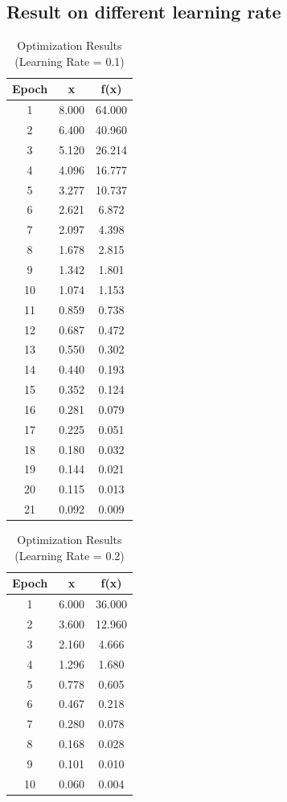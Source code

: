 \documentclass{article}
\begin{document}
\subsection{Result on different learning rate}
\begin{table}[h!]
\centering
\caption{Optimization Results (Learning Rate = 0.1)}
\label{tab:optimization_results}
\begin{tabular}{|c|c|c|}
\hline
\textbf{Epoch} & \textbf{x} & \textbf{f(x)} \\ \hline
1  & 8.000 & 64.000 \\ \hline
2  & 6.400 & 40.960 \\ \hline
3  & 5.120 & 26.214 \\ \hline
4  & 4.096 & 16.777 \\ \hline
5  & 3.277 & 10.737 \\ \hline
6  & 2.621 & 6.872  \\ \hline
7  & 2.097 & 4.398  \\ \hline
8  & 1.678 & 2.815  \\ \hline
9  & 1.342 & 1.801  \\ \hline
10 & 1.074 & 1.153  \\ \hline
11 & 0.859 & 0.738  \\ \hline
12 & 0.687 & 0.472  \\ \hline
13 & 0.550 & 0.302  \\ \hline
14 & 0.440 & 0.193  \\ \hline
15 & 0.352 & 0.124  \\ \hline
16 & 0.281 & 0.079  \\ \hline
17 & 0.225 & 0.051  \\ \hline
18 & 0.180 & 0.032  \\ \hline
19 & 0.144 & 0.021  \\ \hline
20 & 0.115 & 0.013  \\ \hline
21 & 0.092 & 0.009  \\ \hline
\end{tabular}
\end{table}
\begin{table}[h!]
\centering
\caption{Optimization Results (Learning Rate = 0.2)}
\label{tab:optimization_02}
\begin{tabular}{|c|c|c|}
\hline
\textbf{Epoch} & \textbf{x} & \textbf{f(x)} \\ \hline
1  & 6.000 & 36.000 \\ \hline
2  & 3.600 & 12.960 \\ \hline
3  & 2.160 & 4.666  \\ \hline
4  & 1.296 & 1.680  \\ \hline
5  & 0.778 & 0.605  \\ \hline
6  & 0.467 & 0.218  \\ \hline
7  & 0.280 & 0.078  \\ \hline
8  & 0.168 & 0.028  \\ \hline
9  & 0.101 & 0.010  \\ \hline
10 & 0.060 & 0.004  \\ \hline
\end{tabular}
\end{table}
\end{document}
